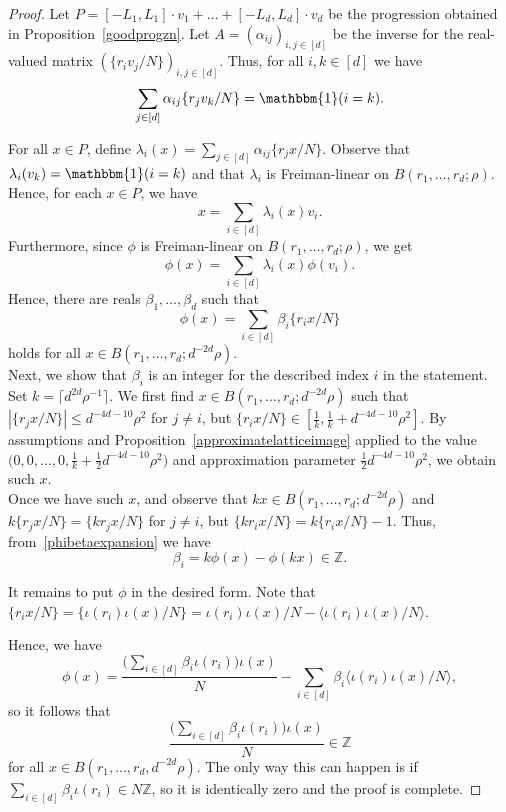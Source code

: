\documentclass[a4paper,11pt]{article}
\numberwithin{theorem}{section}
\theoremstyle{definition}
\newcommand\id{\mathbbm{1}}
\newcommand{\lr}[1]{
    \langle #1\rangle
}
\begin{document}
\begin{proof}
    Let $P = [-L_1, L_1] \cdot v_1 + \dots + [-L_d, L_d] \cdot v_d$ be the progression obtained in Proposition~\ref{goodprogzn}. Let $A = (\alpha_{ij})_{i, j \in [d]}$ be the inverse for the real-valued matrix $(\{r_i v_j/N\})_{i,j \in [d]}$. Thus, for all $i, k \in [d]$ we have
    \[\sum_{j \in [d]} \alpha_{i j} \{r_j v_k/N\} = \id(i = k).\]

    For all $x \in P$, define $\lambda_i(x) = \sum_{j \in [d]} \alpha_{ij} \{r_j x/N\}$. Observe that $\lambda_i(v_k) = \id(i = k)$ and that $\lambda_i$ is Freiman-linear on $B(r_1, \dots, r_d; \rho)$. Hence, for each $x \in P$, we have
    \[x = \sum_{i \in [d]} \lambda_i(x) v_i.\]
    Furthermore, since $\phi$ is Freiman-linear on $B(r_1, \dots, r_d; \rho)$, we get 
    \[\phi(x) = \sum_{i \in [d]} \lambda_i(x) \phi(v_i).\]
    Hence, there are reals $\beta_1, \dots, \beta_d$ such that 
    \begin{equation}
        \phi(x) = \sum_{i \in [d]} \beta_i \{r_i x/N\}\label{phibetaexpansion}
    \end{equation}
    holds for all $x \in B(r_1, \dots, r_d; d^{-2d} \rho)$.\\

    Next, we show that $\beta_i$ is an integer for the described index $i$ in the statement.\\
    \indent Set $k = \lceil d^{2d}  \rho^{-1} \rceil$.  We first find $x \in B(r_1, \dots, r_d; d^{-2d} \rho)$ such that $|\{r_j x / N\}| \leq d^{-4d-10}\rho^2$ for $j \not= i$, but $\{r_ix /N\} \in [\frac{1}{k}, \frac{1}{k} + d^{-4d-10}\rho^2]$. By assumptions and Proposition~\ref{approximatelatticeimage} applied to the value $\Big(0,0, \dots, 0,  \frac{1}{k} + \frac{1}{2}d^{-4d-10}\rho^2\Big)$ and approximation parameter $\frac{1}{2}d^{-4d-10}\rho^2$, we obtain such $x$.\\

    Once we have such $x$, and observe that $k x \in B(r_1, \dots, r_d; d^{-2d} \rho)$ and $ k\{r_j x/N\} =  \{kr_j x/N\}$ for $j \not= i$, but $\{kr_ix/N\} = k  \{r_i x/N\} - 1$. Thus, from~\eqref{phibetaexpansion} we have
    \[\beta_i = k \phi(x) - \phi(kx) \in \mathbb{Z}.\]

    It remains to put $\phi$ in the desired form. Note that $\{r_i x / N\} = \{\iota(r_i) \iota(x) / N\} = \iota(r_i) \iota(x) / N - \lr{\iota(r_i) \iota(x) / N}$.

    Hence, we have 
    \[\phi(x) = \frac{\Big(\sum_{i \in [d]} \beta_i \iota(r_i)\Big) \iota(x) }{N} - \sum_{i \in [d]} \beta_i\lr{\iota(r_i) \iota(x) /N},\]
    so it follows that 
    \[\frac{\Big(\sum_{i \in [d]} \beta_i \iota(r_i)\Big) \iota(x) }{N}  \in \mathbb{Z}\]
    for all $x \in B(r_1, \dots, r_d, d^{-2d}\rho)$. The only way this can happen is if $\sum_{i \in [d]} \beta_i \iota(r_i) \in N \mathbb{Z}$, so it is identically zero and the proof is complete.
    
\end{proof}
\end{document}
